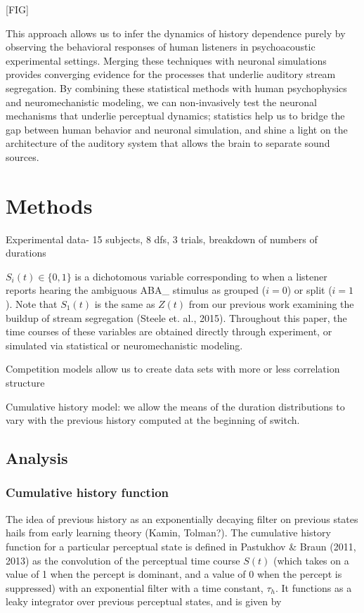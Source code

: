 [FIG]

This approach allows us to infer the dynamics of history dependence purely by observing the behavioral responses of human listeners in psychoacoustic experimental settings. Merging these techniques with neuronal simulations provides converging evidence for the processes that underlie auditory stream segregation. By combining these statistical methods with human psychophysics and neuromechanistic modeling, we can non-invasively test the neuronal mechanisms that underlie perceptual dynamics; statistics help us to bridge the gap between human behavior and neuronal simulation, and shine a light on the architecture of the auditory system that allows the brain to separate sound sources.

\section{Methods}

Experimental data- 15 subjects, 8 dfs, 3 trials, breakdown of numbers of durations

$S_i(t) \in \{0,1\}$ is a dichotomous variable corresponding to when a listener reports hearing the ambiguous ABA\_ stimulus as grouped ($i=0$) or split ($i=1$). Note that $S_1(t)$ is the same as $Z(t)$ from our previous work examining the buildup of stream segregation (Steele et. al., 2015). Throughout this paper, the time courses of these variables are obtained directly through experiment, or simulated via statistical or neuromechanistic modeling.

Competition models allow us to create data sets with more or less correlation structure 



Cumulative history model: we allow the means of the duration distributions to vary with the previous history computed at the beginning of switch.

\subsection{Analysis}

\subsubsection{Cumulative history function}

The idea of previous history as an exponentially decaying filter on previous states hails from early learning theory (Kamin, Tolman?). The cumulative history function for a particular perceptual state is defined in Pastukhov \& Braun (2011, 2013) as the convolution of the perceptual time course $S(t)$ (which takes on a value of 1 when the percept is dominant, and a value of 0 when the percept is suppressed) with an exponential filter with a time constant, $\tau_h$. It functions as a leaky integrator over previous perceptual states, and is given by

